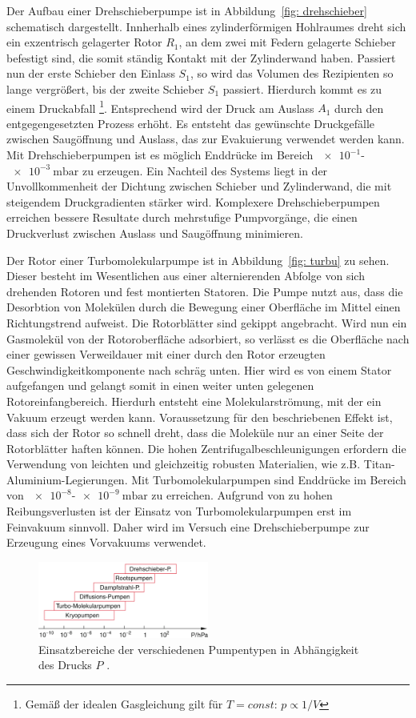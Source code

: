 Der Aufbau einer Drehschieberpumpe ist in Abbildung~\ref{fig: drehschieber} schematisch dargestellt. Innherhalb
eines zylinderförmigen Hohlraumes dreht sich ein exzentrisch gelagerter Rotor $R_1$, an dem zwei mit Federn gelagerte
Schieber befestigt sind, die somit ständig Kontakt mit der Zylinderwand haben. Passiert nun der erste Schieber den
Einlass $S_1$, so wird das Volumen des Rezipienten so lange vergrößert, bis der zweite Schieber $S_1$ passiert.
Hierdurch kommt es zu einem Druckabfall \footnote{Gemäß der idealen Gasgleichung gilt für $T=const$: $p\propto 1/V$}.
Entsprechend wird der Druck am Auslass $A_1$ durch den entgegengesetzten Prozess erhöht.
Es entsteht das gewünschte
Druckgefälle zwischen Saugöffnung und Auslass, das zur Evakuierung verwendet werden kann. Mit Drehschieberpumpen
ist es möglich Enddrücke im Bereich $\num{e-1}$-$\SI{e-3}{\milli\bar}$ zu erzeugen. Ein Nachteil des
Systems liegt in der Unvollkommenheit der Dichtung zwischen Schieber und Zylinderwand, die mit steigendem
Druckgradienten stärker wird. Komplexere Drehschieberpumpen
erreichen bessere Resultate durch mehrstufige Pumpvorgänge, die einen Druckverlust
zwischen Auslass und Saugöffnung minimieren.

Der Rotor einer Turbomolekularpumpe ist in Abbildung~\ref{fig: turbu} zu sehen. Dieser besteht im Wesentlichen aus einer
alternierenden Abfolge von sich drehenden Rotoren und fest montierten Statoren. Die Pumpe nutzt aus, dass die
Desorbtion von Molekülen durch die Bewegung einer Oberfläche im Mittel einen Richtungstrend aufweist. Die Rotorblätter
sind gekippt angebracht. Wird nun ein Gasmolekül von der Rotoroberfläche adsorbiert, so verlässt es die Oberfläche
nach einer gewissen Verweildauer mit einer durch den Rotor erzeugten Geschwindigkeitkomponente nach schräg unten. Hier
wird es von einem Stator aufgefangen und gelangt somit in einen weiter unten gelegenen Rotoreinfangbereich.
Hierdurh entsteht eine Molekularströmung, mit der ein Vakuum erzeugt werden kann. Voraussetzung für den beschriebenen
Effekt ist, dass sich der Rotor so schnell dreht, dass die Moleküle nur an einer Seite der Rotorblätter haften können.
Die hohen Zentrifugalbeschleunigungen erfordern die Verwendung von leichten und gleichzeitig robusten Materialien, wie z.B.
Titan-Aluminium-Legierungen. Mit Turbomolekularpumpen sind Enddrücke im Bereich von $\num{e-8}$-$\SI{e-9}{\milli\bar}$
zu erreichen. Aufgrund von zu hohen Reibungsverlusten ist der Einsatz von Turbomolekularpumpen erst im Feinvakuum
sinnvoll. Daher wird im Versuch eine Drehschieberpumpe zur Erzeugung eines Vorvakuums verwendet.
\begin{figure}
  \centering
  \includegraphics[width = 0.5\textwidth]{theorie_plots/einsatzbereich_pumpen.png}
  \caption{Einsatzbereiche der verschiedenen Pumpentypen in Abhängigkeit des Drucks $P$ \cite{dem1}.}
  \label{fig: einordnung_pumpen}
\end{figure}


